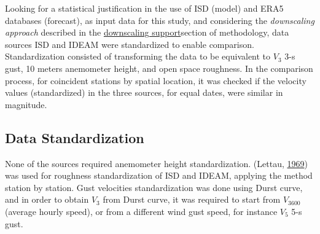 \documentclass[12pt,oneside]{reedthesis}
\begin{document}
Looking for a statistical justification in the use of ISD (model) and ERA5 databases (forecast), as input data for this study, and considering the \emph{downscaling approach} described in the \protect\hyperlink{ds}{downscaling support}section of methodology, data sources ISD and IDEAM were standardized to enable comparison. Standardization consisted of transforming the data to be equivalent to \(V_3\) 3-s gust, 10 meters anemometer height, and open space roughness. In the comparison process, for coincident stations by spatial location, it was checked if the velocity values (standardized) in the three sources, for equal dates, were similar in magnitude.

\hypertarget{data-standardization}{%
\subsection{Data Standardization}\label{data-standardization}}

None of the sources required anemometer height standardization. (Lettau, \protect\hyperlink{ref-Lettau1969}{1969}) was used for roughness standardization of ISD and IDEAM, applying the method station by station. Gust velocities standardization was done using Durst curve, and in order to obtain \(V_3\) from Durst curve, it was required to start from \(V_{3600}\) (average hourly speed), or from a different wind gust speed, for instance \(V_5\) 5-s gust.
\end{document}
